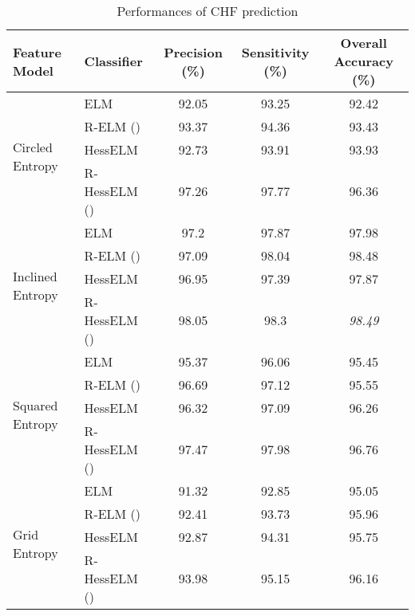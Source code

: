 \documentclass[twocolumn]{svjour3}
\begin{document}
\begin{table*}
\centering
\caption{Performances of CHF prediction}
\label{Table1}
\begin{tabular}{@{}llccc@{}}
\toprule
Feature Model                     & Classifier   & Precision (\%) & Sensitivity (\%) & Overall Accuracy (\%) \\ \midrule
\multirow{4}{*}{Circled Entropy}  & ELM          & 92.05          & 93.25            & 92.42                  \\
                                  & R-ELM ()     & 93.37          & 94.36            & 93.43                  \\
                                  & HessELM      & 92.73          & 93.91            & 93.93                  \\
                                  & R-HessELM () & 97.26          & 97.77            & 96.36                  \\
\multirow{4}{*}{Inclined Entropy} & ELM          & 97.2           & 97.87            & 97.98                  \\
                                  & R-ELM ()     & 97.09          & 98.04            & 98.48                  \\
                                  & HessELM      & 96.95          & 97.39            & 97.87                  \\
                                  & R-HessELM () & 98.05          & 98.3             & \textit{98.49}                  \\
\multirow{4}{*}{Squared Entropy}  & ELM          & 95.37          & 96.06            & 95.45                  \\
                                  & R-ELM ()     & 96.69          & 97.12            & 95.55                  \\
                                  & HessELM      & 96.32          & 97.09            & 96.26                  \\
                                  & R-HessELM () & 97.47          & 97.98            & 96.76                  \\
\multirow{4}{*}{Grid Entropy}     & ELM          & 91.32          & 92.85            & 95.05                  \\
                                  & R-ELM ()     & 92.41          & 93.73            & 95.96                  \\
                                  & HessELM      & 92.87          & 94.31            & 95.75                  \\
                                  & R-HessELM () & 93.98          & 95.15            & 96.16                  \\ \cmidrule(l){1-5} 
\end{tabular}
\end{table*}
\end{document}
